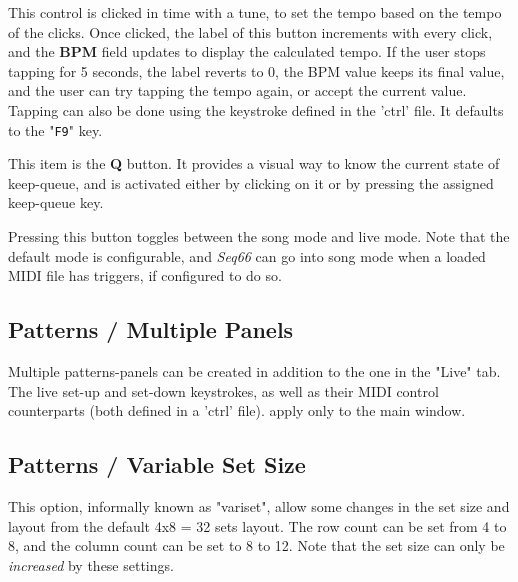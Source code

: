    This control is clicked in time with a tune, to set the
   tempo based on the tempo of the clicks.  Once clicked, the label of this
   button increments with every click, and the \textbf{BPM} field updates to
   display the calculated tempo.  If the user stops tapping for 5 seconds, the
   label reverts to 0, the BPM value keeps its final value, and the user can
   try tapping the tempo again, or accept the current value.
   Tapping can also be done using the keystroke defined
   in the 'ctrl' file.
   It defaults to the "\texttt{F9}" key.

   This item is the \textbf{Q} button.
   It provides a visual way to know the current state of keep-queue, and is
   activated either by clicking on it or by pressing the assigned keep-queue
   key.

   Pressing this button toggles between the song mode and live mode.
   Note that the default mode is configurable, and \textsl{Seq66} can go into
   song mode when a loaded MIDI file has triggers, if configured to do so.

\subsection{Patterns / Multiple Panels}
\label{subsec:patterns_panel_multiple}

   Multiple patterns-panels can be created in addition to the one in the "Live"
   tab.  The live set-up and set-down keystrokes, as well as their MIDI control
   counterparts (both defined in a 'ctrl' file).
   apply only to the main window.

%
%

\subsection{Patterns / Variable Set Size}
\label{subsec:patterns_panel_variset}

   This option, informally known as "variset", allow some changes in
   the set size and layout from the default 4x8 = 32 sets layout.
   The row count can be set from 4 to 8, and the column count can be set to 8
   to 12.  Note that the set size can only be \textsl{increased} by these
   settings.


